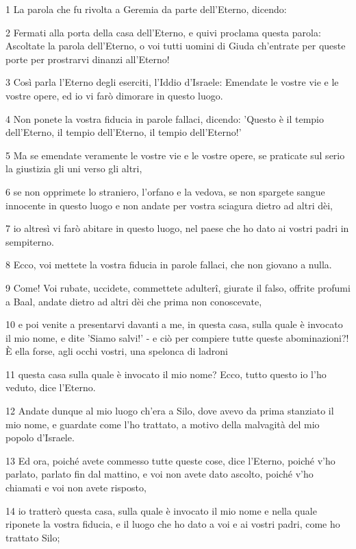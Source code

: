 \par 1 La parola che fu rivolta a Geremia da parte dell'Eterno, dicendo:
\par 2 Fermati alla porta della casa dell'Eterno, e quivi proclama questa parola: Ascoltate la parola dell'Eterno, o voi tutti uomini di Giuda ch'entrate per queste porte per prostrarvi dinanzi all'Eterno!
\par 3 Così parla l'Eterno degli eserciti, l'Iddio d'Israele: Emendate le vostre vie e le vostre opere, ed io vi farò dimorare in questo luogo.
\par 4 Non ponete la vostra fiducia in parole fallaci, dicendo: 'Questo è il tempio dell'Eterno, il tempio dell'Eterno, il tempio dell'Eterno!'
\par 5 Ma se emendate veramente le vostre vie e le vostre opere, se praticate sul serio la giustizia gli uni verso gli altri,
\par 6 se non opprimete lo straniero, l'orfano e la vedova, se non spargete sangue innocente in questo luogo e non andate per vostra sciagura dietro ad altri dèi,
\par 7 io altresì vi farò abitare in questo luogo, nel paese che ho dato ai vostri padri in sempiterno.
\par 8 Ecco, voi mettete la vostra fiducia in parole fallaci, che non giovano a nulla.
\par 9 Come! Voi rubate, uccidete, commettete adulterî, giurate il falso, offrite profumi a Baal, andate dietro ad altri dèi che prima non conoscevate,
\par 10 e poi venite a presentarvi davanti a me, in questa casa, sulla quale è invocato il mio nome, e dite 'Siamo salvi!' - e ciò per compiere tutte queste abominazioni?! È ella forse, agli occhi vostri, una spelonca di ladroni
\par 11 questa casa sulla quale è invocato il mio nome? Ecco, tutto questo io l'ho veduto, dice l'Eterno.
\par 12 Andate dunque al mio luogo ch'era a Silo, dove avevo da prima stanziato il mio nome, e guardate come l'ho trattato, a motivo della malvagità del mio popolo d'Israele.
\par 13 Ed ora, poiché avete commesso tutte queste cose, dice l'Eterno, poiché v'ho parlato, parlato fin dal mattino, e voi non avete dato ascolto, poiché v'ho chiamati e voi non avete risposto,
\par 14 io tratterò questa casa, sulla quale è invocato il mio nome e nella quale riponete la vostra fiducia, e il luogo che ho dato a voi e ai vostri padri, come ho trattato Silo;
